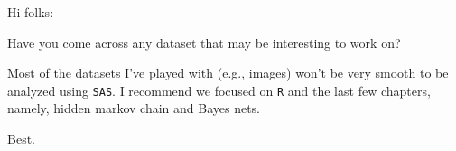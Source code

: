 \item[Feburary 11, 2018]
{
\zjy
{
Hi folks:

Have you come across any dataset that may be interesting to work on?

Most of the datasets I've played with (e.g., images) won't be very smooth to be analyzed using \texttt{SAS}.
I recommend we focused on \texttt{R} and the last few chapters, namely,
hidden markov chain and Bayes nets.

Best.
}
}
